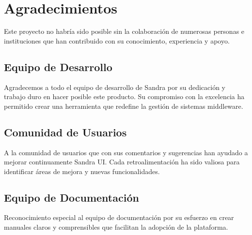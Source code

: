 
\chapter*{Agradecimientos}

Este proyecto no habría sido posible sin la colaboración de numerosas personas e instituciones que han contribuido con su conocimiento, experiencia y apoyo.

\section*{Equipo de Desarrollo}

Agradecemos a todo el equipo de desarrollo de Sandra por su dedicación y trabajo duro en hacer posible este producto. Su compromiso con la excelencia ha permitido crear una herramienta que redefine la gestión de sistemas middleware.

\section*{Comunidad de Usuarios}

A la comunidad de usuarios que con sus comentarios y sugerencias han ayudado a mejorar continuamente Sandra UI. Cada retroalimentación ha sido valiosa para identificar áreas de mejora y nuevas funcionalidades.

\section*{Equipo de Documentación}

Reconocimiento especial al equipo de documentación por su esfuerzo en crear manuales claros y comprensibles que facilitan la adopción de la plataforma.

\clearpage
